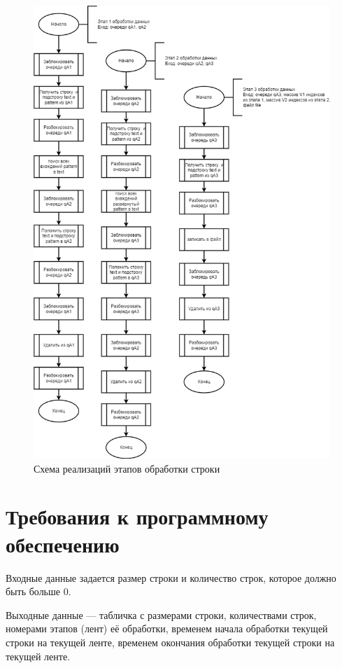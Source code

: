 \clearpage

\begin{figure}[h]
	\centering
	\includegraphics[scale=0.5]{img/stages.png}
	\caption{Схема реализаций этапов обработки строки}
	\label{fig:stages}
\end{figure} 

\clearpage

\section{Требования к программному обеспечению}

Входные данные задается размер строки и количество строк, которое должно быть больше 0. 

Выходные данные --- табличка с размерами строки, количествами строк, номерами этапов (лент) её обработки, временем начала обработки текущей строки на текущей ленте, временем окончания обработки текущей строки на текущей ленте.


